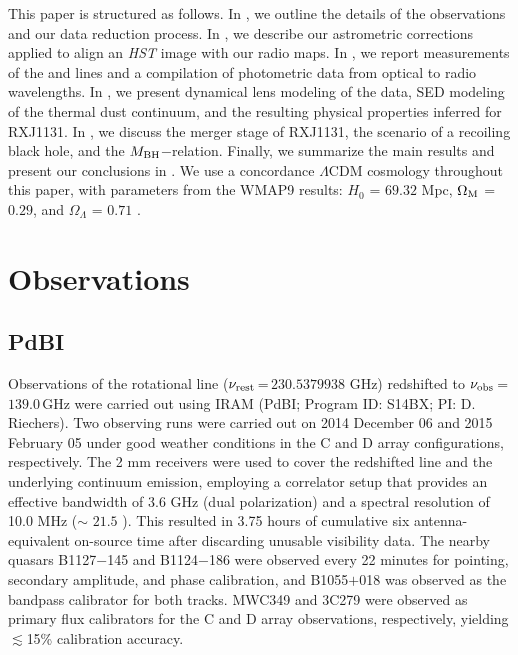 \documentclass[]{emulateapj}
\begin{document}
This paper is structured as follows.
In , we outline the details of the observations and our data reduction process.
In , we describe our astrometric corrections applied to align an {\it HST} image with our radio maps.
In , we report measurements of the \bco and \cco lines and a compilation of photometric data from optical to radio wavelengths.
In , we present dynamical lens modeling of the \bco data, SED modeling of the thermal dust continuum, 
and the resulting physical properties inferred for RXJ1131.
In , we discuss the merger stage of RXJ1131, 
the scenario of a recoiling black hole, and the $M_{\rm BH}$$-$\mdyn relation.
Finally, we summarize the main results and present our conclusions in .
We use a concordance $\Lambda$CDM cosmology throughout this paper, with
parameters from the WMAP9 results:
$H_0$ = $69.32$ \kms Mpc\pmOne, $\Omega_{\rm M}$ = $0.29$, and
$\Omega_{\Lambda}$ = $0.71$ \citep{Hinshaw13a}.

\section{Observations} \label{sec:obs}
\subsection{PdBI \bco}
Observations of the \bco rotational line
($\nu_{\rm rest}$\,=\,$230.5379938$ GHz) redshifted to $\nu_{\rm obs}$\,=\,$139.0$\,GHz
were carried out using IRAM \pdbi (PdBI; Program ID: S14BX; PI: D.
Riechers). Two observing runs were carried out on 2014 December 06 and 2015
February 05 under good weather conditions in the C and D array configurations,
respectively. The 2 mm receivers were used to cover the redshifted \bco line
and the underlying continuum emission, employing a correlator setup that provides
an effective bandwidth of 3.6 GHz (dual polarization) and a spectral resolution of 10.0 MHz ($\sim$
$21.5$ \kms). This resulted in 3.75 hours of cumulative six antenna-equivalent on-source
 time after discarding unusable visibility data.
The nearby quasars B1127$-$145 and B1124$-$186 were observed every 22 minutes
for pointing, secondary amplitude, and phase calibration, and B1055$+$018 was
observed as the bandpass calibrator for both tracks.
MWC349 and 3C279 were observed as primary flux calibrators for the C and D
array observations, respectively, yielding $\lesssim$15\% calibration accuracy.
\end{document}
